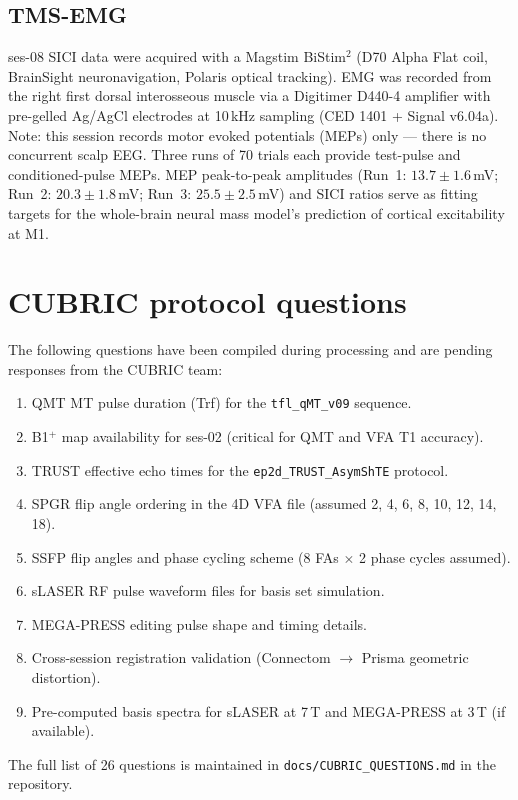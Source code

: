 \documentclass[11pt,a4paper]{article}\usepackage[]{graphicx}\usepackage[]{xcolor}
\begin{document}
\subsection{TMS-EMG}

ses-08 SICI data were acquired with a Magstim BiStim$^2$ (D70 Alpha
Flat coil, BrainSight neuronavigation, Polaris optical tracking).
EMG was recorded from the right first dorsal interosseous muscle via
a Digitimer D440-4 amplifier with pre-gelled Ag/AgCl electrodes at
10\,kHz sampling (CED 1401 + Signal v6.04a). Note: this session
records motor evoked potentials (MEPs) only --- there is no concurrent
scalp EEG. Three runs of 70 trials each provide test-pulse and
conditioned-pulse MEPs. MEP peak-to-peak amplitudes (Run~1:
$13.7 \pm 1.6$\,mV; Run~2: $20.3 \pm 1.8$\,mV; Run~3:
$25.5 \pm 2.5$\,mV) and SICI ratios serve as fitting targets for
the whole-brain neural mass model's prediction of cortical
excitability at M1.

\section{CUBRIC protocol questions}
\label{app:cubric}

The following questions have been compiled during processing and are
pending responses from the CUBRIC team:

\begin{enumerate}
  \item QMT MT pulse duration (Trf) for the \texttt{tfl\_qMT\_v09}
    sequence.
  \item B1$^+$ map availability for ses-02 (critical for QMT and VFA
    T1 accuracy).
  \item TRUST effective echo times for the
    \texttt{ep2d\_TRUST\_AsymShTE} protocol.
  \item SPGR flip angle ordering in the 4D VFA file (assumed
    2, 4, 6, 8, 10, 12, 14, 18\textdegree).
  \item SSFP flip angles and phase cycling scheme (8 FAs $\times$ 2
    phase cycles assumed).
  \item sLASER RF pulse waveform files for basis set simulation.
  \item MEGA-PRESS editing pulse shape and timing details.
  \item Cross-session registration validation (Connectom $\to$ Prisma
    geometric distortion).
  \item Pre-computed basis spectra for sLASER at 7\,T and MEGA-PRESS
    at 3\,T (if available).
\end{enumerate}

The full list of 26 questions is maintained in
\texttt{docs/CUBRIC\_QUESTIONS.md} in the repository.
\end{document}
